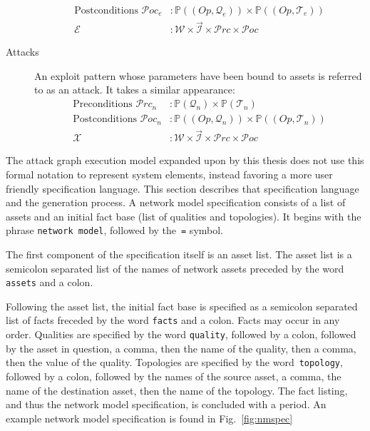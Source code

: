 \begin{description}
\begin{align*}
			\text{Postconditions } \mathcal{P}oc_e&: \mathbb{P}((Op,\mathcal{Q}_e)) \times \mathbb{P}((Op,\mathcal{T}_e)) \\
			\mathcal{E}&: \mathcal{W} \times \vec{\mathcal{I}} \times  \mathcal{P}rc \times \mathcal{P}oc
        \end{align*}
    \item[Attacks] An exploit pattern whose parameters have been bound to assets is referred to as an
		attack. It takes a similar appearance:
		\begin{align*}
			\text{Preconditions } \mathcal{P}rc_n &: \mathbb{P}(\mathcal{Q}_n) \times \mathbb{P}(\mathcal{T}_n) \\
			\text{Postconditions } \mathcal{P}oc_n&: \mathbb{P}((Op,\mathcal{Q}_n)) \times \mathbb{P}((Op,\mathcal{T}_n)) \\
			\mathcal{X}&: \mathcal{W} \times \vec{\mathcal{I}} \times  \mathcal{P}rc \times \mathcal{P}oc
        \end{align*}
\end{description}

The attack graph execution model expanded upon by this thesis does 
not use this formal notation to represent system elements, instead favoring a 
more user friendly specification language. This section describes that 
specification language and the generation process. %
A network model specification consists of a list of assets and an initial fact base 
(list of qualities and topologies). It begins with the phrase \texttt{network model}, followed
by the~\texttt{=} symbol. 

The first component of the specification itself is an asset list.
The asset list is a semicolon separated list of the names of network
assets preceded by the word \texttt{assets} and a colon.

Following the asset list, the initial
fact base is specified as a semicolon separated list of facts freceded by the 
word \texttt{facts} and a colon. Facts may occur in any order. Qualities are 
specified by the word \texttt{quality}, followed by a colon, followed by the 
asset in question, a comma, then the name of the quality, then a comma, 
then the value of the quality. Topologies are specified by the 
word~\texttt{topology}, followed by a colon, followed by the names of the 
source asset, a comma, the name of the destination asset, then the name of 
the topology. The fact listing, 
and thus the network model specification, is concluded with a period. 
An example network model specification is found in Fig.~\ref{fig:nmspec}

